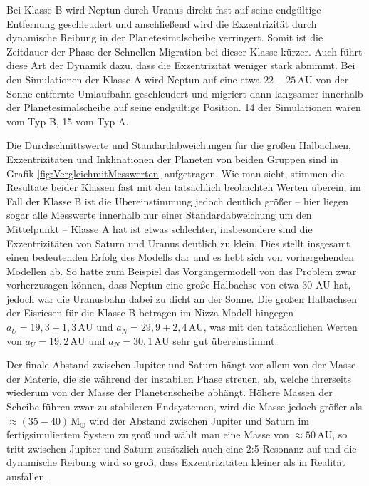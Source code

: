 \documentclass[12pt,a4paper,twoside]{article}
\newcommand{\AU}{\,\mathrm{AU}}
\newcommand{\ME}{\,\mathrm{M_\oplus}}
\begin{document}
Bei Klasse B wird Neptun durch Uranus direkt fast auf seine endgültige Entfernung geschleudert %
und anschließend wird die Exzentrizität durch dynamische Reibung in der Planetesimalscheibe verringert\cite{Nesvorny2007}. Somit ist die Zeitdauer der Phase der Schnellen Migration bei dieser Klasse kürzer\cite{Tsiganis2005}. Auch führt diese Art der Dynamik dazu, dass die Exzentrizität weniger stark abnimmt\cite{Tsiganis2005}.
Bei den Simulationen der Klasse A wird Neptun auf eine etwa $22-25 \AU$ von der Sonne entfernte Umlaufbahn geschleudert und migriert dann langsamer innerhalb der Planetesimalscheibe auf seine endgültige Position\cite{Tsiganis2005}.
14 der Simulationen waren vom Typ B, 15 vom Typ A. %

Die Durchschnittswerte und Standardabweichungen für die großen Halbachsen, Exzentrizitäten und Inklinationen der Planeten von beiden Gruppen sind in Grafik \ref{fig:VergleichmitMesswerten} aufgetragen. Wie man sieht, stimmen die Resultate beider Klassen fast mit den tatsächlich beobachten Werten überein, im Fall der Klasse B ist die Übereinstimmung jedoch deutlich größer – hier liegen sogar alle Messwerte innerhalb nur einer Standardabweichung um den Mittelpunkt\cite{Tsiganis2005} – Klasse A hat ist etwas schlechter, insbesondere sind die Exzentrizitäten von Saturn und Uranus deutlich zu klein\cite{Tsiganis2005,Nesvorny2007}. 
Dies stellt insgesamt einen bedeutenden Erfolg des Modells dar und es hebt sich von vorhergehenden Modellen ab.
So hatte zum Beispiel das Vorgängermodell von \cite{Gomes2004} %
das Problem zwar vorherzusagen können, dass Neptun eine große Halbachse von etwa 30 AU hat, jedoch war die Uranusbahn dabei zu dicht an der Sonne.
Die großen Halbachsen der Eisriesen für die Klasse B betragen im Nizza-Modell hingegen $a_U = 19,3 \pm 1,3 \AU$ und $a_N = 29,9 \pm 2,4 \AU$, was mit den tatsächlichen Werten von $a_U = 19,2 \AU$ und $a_N = 30,1 \AU$ sehr gut übereinstimmt\cite{Tsiganis2005}.

Der finale Abstand zwischen Jupiter und Saturn hängt vor allem von der Masse der Materie, %
die sie während der instabilen Phase streuen, ab, welche ihrerseits wiederum von der Masse der Planetenscheibe abhängt\cite{Tsiganis2005}. %
Höhere Massen der Scheibe führen zwar zu stabileren Endsystemen, wird die Masse jedoch größer als $\approx (35-40) \ME$ wird der Abstand zwischen Jupiter und Saturn im fertigsimuliertem System zu groß\cite{Tsiganis2005} und wählt man eine Masse von $\approx 50 \AU$, so tritt zwischen Jupiter und Saturn zusätzlich auch eine 2:5 Resonanz auf und die dynamische Reibung wird so groß, dass Exzentrizitäten kleiner als in Realität ausfallen\cite{Tsiganis2005}.
\end{document}
